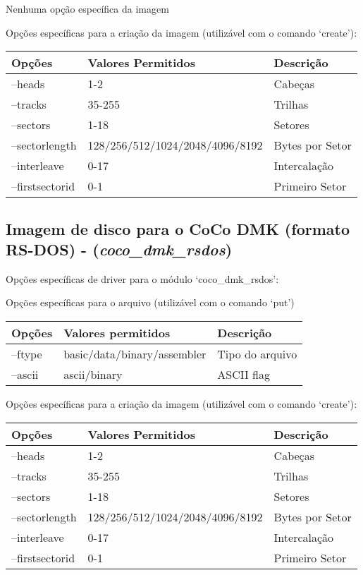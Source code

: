 \documentclass[letterpaper,10pt,brazil]{sphinxmanual}
\begin{document}
Nenhuma opção específica da imagem

Opções específicas para a criação da imagem (utilizável com o comando `create'):

\noindent\begin{tabulary}{\linewidth}{|L|L|L|}
\hline

Opções
&
Valores Permitidos
&
Descrição
\\
\hline
--heads
&
1-2
&
Cabeças
\\
\hline
--tracks
&
35-255
&
Trilhas
\\
\hline
--sectors
&
1-18
&
Setores
\\
\hline
--sectorlength
&
128/256/512/1024/2048/4096/8192
&
Bytes por Setor
\\
\hline
--interleave
&
0-17
&
Intercalação
\\
\hline
--firstsectorid
&
0-1
&
Primeiro Setor
\\
\hline\end{tabulary}



\subsection{Imagem de disco para o CoCo DMK (formato RS-DOS) - (\emph{coco\_dmk\_rsdos})}
\label{tools/imgtool:imagem-de-disco-para-o-coco-dmk-formato-rs-dos-coco-dmk-rsdos}
Opções específicas de driver para o módulo `coco\_dmk\_rsdos':

Opções específicas para o arquivo (utilizável com o comando `put')

\noindent\begin{tabulary}{\linewidth}{|L|L|L|}
\hline

Opções
&
Valores permitidos
&
Descrição
\\
\hline
--ftype
&
basic/data/binary/assembler
&
Tipo do arquivo
\\
\hline
--ascii
&
ascii/binary
&
ASCII flag
\\
\hline\end{tabulary}


Opções específicas para a criação da imagem (utilizável com o comando `create'):

\noindent\begin{tabulary}{\linewidth}{|L|L|L|}
\hline

Opções
&
Valores Permitidos
&
Descrição
\\
\hline
--heads
&
1-2
&
Cabeças
\\
\hline
--tracks
&
35-255
&
Trilhas
\\
\hline
--sectors
&
1-18
&
Setores
\\
\hline
--sectorlength
&
128/256/512/1024/2048/4096/8192
&
Bytes por Setor
\\
\hline
--interleave
&
0-17
&
Intercalação
\\
\hline
--firstsectorid
&
0-1
&
Primeiro Setor
\\
\hline\end{tabulary}
\end{document}
